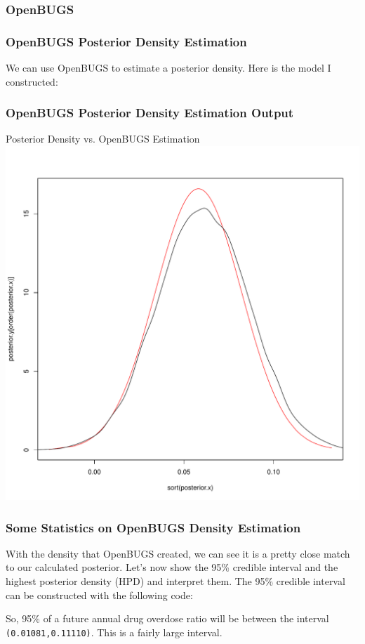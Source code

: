 \documentclass[10pt]{beamer}
\begin{document}
\subsubsection{OpenBUGS}
\begin{frame}
\frametitle{OpenBUGS Posterior Density Estimation}
	We can use OpenBUGS to estimate a posterior density. Here is the model I constructed:
		
\end{frame}

\begin{frame}
\frametitle{OpenBUGS Posterior Density Estimation Output}
	\begin{center}
	Posterior Density vs. OpenBUGS Estimation\\
	\includegraphics[scale=0.3]{openbugs.pdf} 
	\end{center}
\end{frame}

\begin{frame}
\frametitle{Some Statistics on OpenBUGS Density Estimation}
	With the density that OpenBUGS created, we can see it is a pretty close match to our calculated posterior. Let's now show the 95\% credible interval and the highest posterior density (HPD) and interpret them. The 95\% credible interval can be constructed with the following code:
	
So, 95\% of a future annual drug overdose ratio will be between the interval \texttt{(0.01081,0.11110)}. This is a fairly large interval.
\end{frame}
\end{document}
